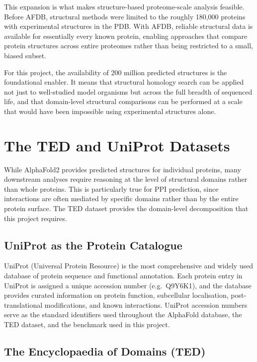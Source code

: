 This expansion is what makes structure-based proteome-scale analysis feasible.
Before AFDB, structural methods were limited to the roughly 180,000 proteins with experimental structures in the PDB.
With AFDB, reliable structural data is available for essentially every known protein, enabling approaches that compare protein structures across entire proteomes rather than being restricted to a small, biased subset.

For this project, the availability of 200 million predicted structures is the foundational enabler.
It means that structural homology search can be applied not just to well-studied model organisms but across the full breadth of sequenced life, and that domain-level structural comparisons can be performed at a scale that would have been impossible using experimental structures alone.


\section{The TED and UniProt Datasets}
\label{sec:bg-ted}

While AlphaFold2 provides predicted structures for individual proteins, many downstream analyses require reasoning at the level of structural domains rather than whole proteins.
This is particularly true for PPI prediction, since interactions are often mediated by specific domains rather than by the entire protein surface.
The TED dataset provides the domain-level decomposition that this project requires.

\subsection{UniProt as the Protein Catalogue}

UniProt (Universal Protein Resource) is the most comprehensive and widely used database of protein sequence and functional annotation.
Each protein entry in UniProt is assigned a unique accession number (e.g.\ Q9Y6K1), and the database provides curated information on protein function, subcellular localisation, post-translational modifications, and known interactions.
UniProt accession numbers serve as the standard identifiers used throughout the AlphaFold database, the TED dataset, and the benchmark used in this project.

\subsection{The Encyclopaedia of Domains (TED)}

